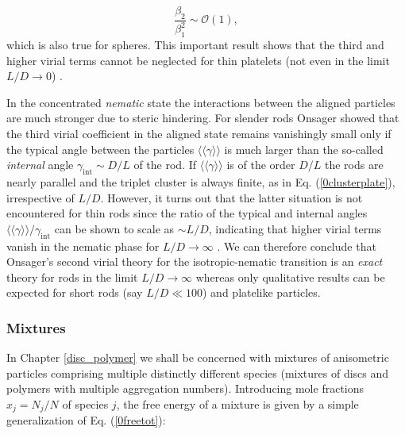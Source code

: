 {\begin{equation}
\frac{\beta_{2}}{\beta_{1}^{2}}\sim \mathcal{O}(1), \label{0clusterplate}
\end{equation}
which is also true for spheres. This important result shows that the third and higher virial terms cannot be neglected for thin platelets (not even in the limit $L/D\rightarrow 0$) \cite{Veerman}.

In the concentrated {\em nematic} state the interactions between the aligned particles are much stronger due to steric hindering. For slender rods Onsager showed that the third virial coefficient in the aligned state remains vanishingly small  only if the typical angle between the particles $\langle\langle \gamma \rangle\rangle $ is much larger than the so-called {\em internal} angle $\gamma_{\text{int}}\sim D/L$ of the rod. If $\langle\langle \gamma \rangle\rangle$ is of the order $D/L$ the rods are nearly parallel and the triplet cluster is always finite, as in Eq. (\ref{0clusterplate}), irrespective of $L/D$. However, it turns out that the latter situation is not encountered for thin rods since the ratio of the typical and internal angles $\langle\langle \gamma \rangle\rangle /\gamma_{\text{int}}$  can be shown to scale as $\sim L/D$, indicating that higher virial terms vanish in the nematic phase  for $L/D\rightarrow \infty$ \cite{Vroege92}. We can therefore conclude that  Onsager's  second virial theory for the isotropic-nematic transition is an {\em exact} theory for rods in the limit $L/D \rightarrow \infty$ whereas  only qualitative results can be expected for short rods (say $L/D\ll 100$) and  platelike particles.

\subsubsection{Mixtures}

In Chapter \ref{disc_polymer} we shall be concerned with mixtures of anisometric particles comprising multiple distinctly different species (mixtures of discs and polymers with multiple aggregation numbers). Introducing  mole fractions $x_{j}=N_{j}/N$ of species $j$,  the free energy of a mixture is given by a simple generalization of Eq. (\ref{0freetot}):

}
